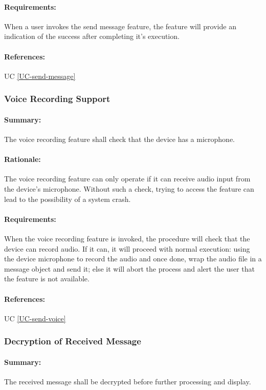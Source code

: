 \documentclass[11pt]{article}
\begin{document}
\paragraph{Requirements:} When a user invokes the send message feature, the feature will provide an indication of the success after completing it's execution.
\paragraph{References:} UC \ref{UC-send-message}

\subsubsection{Voice Recording Support} \label{FR-voice-record-support}
\paragraph{Summary:} The voice recording feature shall check that the device has a microphone.
\paragraph{Rationale:} The voice recording feature can only operate if it can receive audio input from the device's microphone. Without such a check, trying to access the feature can lead to the possibility of a system crash.
\paragraph{Requirements:} When the voice recording feature is invoked, the procedure will check that the device can record audio. If it can, it will proceed with normal execution: using the device microphone to record the audio and once done, wrap the audio file in a message object and send it; else it will abort the process and alert the user that the feature is not available.
\paragraph{References:} UC \ref{UC-send-voice}

\subsubsection{Decryption of Received Message} \label{FR-decrypt-received-message}
\paragraph{Summary:} The received message shall be decrypted before further processing and display.
\end{document}
